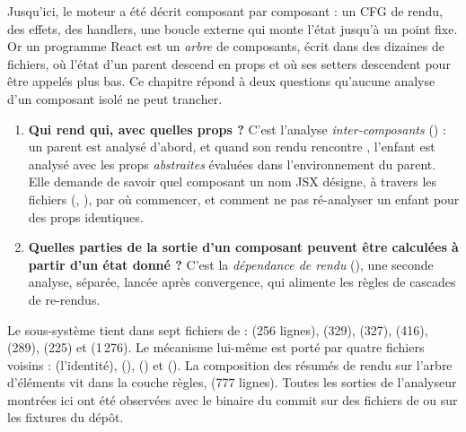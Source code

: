 
Jusqu'ici, le moteur a été décrit composant par composant : un CFG de rendu, des effets, des
handlers, une boucle externe qui monte l'état jusqu'à un point fixe. Or un programme React est
un \emph{arbre} de composants, écrit dans des dizaines de fichiers, où l'état d'un parent
descend en props et où ses setters descendent pour être appelés plus bas. Ce chapitre répond à
deux questions qu'aucune analyse d'un composant isolé ne peut trancher.

\begin{enumerate}
  \item \textbf{Qui rend qui, avec quelles props ?} C'est l'analyse \emph{inter-composants}
        () : un parent est analysé d'abord, et quand son rendu rencontre
        , l'enfant est analysé avec les props \emph{abstraites}
        évaluées dans l'environnement du parent. Elle demande de savoir quel composant un nom
        JSX désigne, à travers les fichiers (, ), par où commencer, et comment
        ne pas ré-analyser un enfant pour des props identiques.
  \item \textbf{Quelles parties de la sortie d'un composant peuvent être calculées à partir
        d'un état donné ?} C'est la \emph{dépendance de rendu} (), une seconde
        analyse, séparée, lancée après convergence, qui alimente les règles de cascades de
        re-rendus.
\end{enumerate}

Le sous-système tient dans sept fichiers de  :
 (256 lignes),  (329),
 (327),  (416),  (289),
 (225) et  (1\,276). Le mécanisme lui-même est porté
par quatre fichiers voisins :  (l'identité),
 (), 
() et  (). La
composition des résumés de rendu sur l'arbre d'éléments vit dans la couche règles,
 (777 lignes). Toutes les sorties de l'analyseur
montrées ici ont été observées avec le binaire du commit \snapshotCommit{} sur des fichiers
de  ou sur les fixtures du dépôt.

